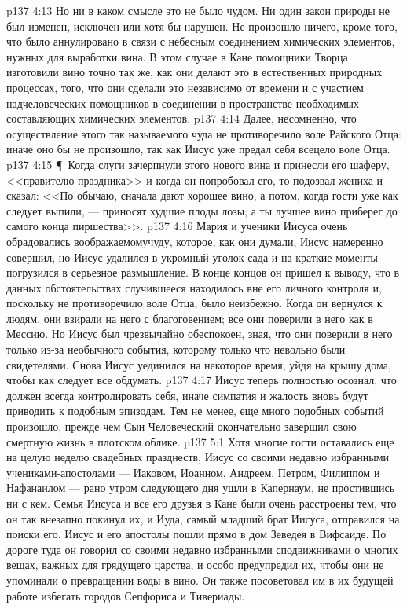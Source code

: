 \vs p137 4:13 Но ни в каком смысле это не было чудом. Ни один закон природы не был изменен, исключен или хотя бы нарушен. Не произошло ничего, кроме того, что было аннулировано  в связи с небесным соединением химических элементов, нужных для выработки вина. В этом случае в Кане помощники Творца изготовили вино точно так же, как они делают это в естественных природных процессах,  того, что они сделали это независимо от времени и с участием надчеловеческих помощников в соединении в пространстве необходимых составляющих химических элементов.
\vs p137 4:14 Далее, несомненно, что осуществление этого так называемого чуда не противоречило воле Райского Отца: иначе оно бы не произошло, так как Иисус уже предал себя всецело воле Отца.
\vs p137 4:15 \P\ Когда слуги зачерпнули этого нового вина и принесли его шаферу, <<правителю праздника>> и когда он попробовал его, то подозвал жениха и сказал: <<По обычаю, сначала дают хорошее вино, а потом, когда гости уже как следует выпили, --- приносят худшие плоды лозы; а ты лучшее вино приберег до самого конца пиршества>>.
\vs p137 4:16 Мария и ученики Иисуса очень обрадовались воображаемомучуду, которое, как они думали, Иисус намеренно совершил, но Иисус удалился в укромный уголок сада и на краткие моменты погрузился в серьезное размышление. В конце концов он пришел к выводу, что в данных обстоятельствах случившееся находилось вне его личного контроля и, поскольку не противоречило воле Отца, было неизбежно. Когда он вернулся к людям, они взирали на него с благоговением; все они поверили в него как в Мессию. Но Иисус был чрезвычайно обеспокоен, зная, что они поверили в него только из\hyp{}за необычного события, которому только что невольно были свидетелями. Снова Иисус уединился на некоторое время, уйдя на крышу дома, чтобы как следует все обдумать.
\vs p137 4:17 Иисус теперь полностью осознал, что должен всегда контролировать себя, иначе симпатия и жалость вновь будут приводить к подобным эпизодам. Тем не менее, еще много подобных событий произошло, прежде чем Сын Человеческий окончательно завершил свою смертную жизнь в плотском облике.
\vs p137 5:1 Хотя многие гости оставались еще на целую неделю свадебных празднеств, Иисус со своими недавно избранными учениками\hyp{}апостолами --- Иаковом, Иоанном, Андреем, Петром, Филиппом и Нафанаилом --- рано утром следующего дня ушли в Капернаум, не простившись ни с кем. Семья Иисуса и все его друзья в Кане были очень расстроены тем, что он так внезапно покинул их, и Иуда, самый младший брат Иисуса, отправился на поиски его. Иисус и его апостолы пошли прямо в дом Зеведея в Вифсаиде. По дороге туда он говорил со своими недавно избранными сподвижниками о многих вещах, важных для грядущего царства, и особо предупредил их, чтобы они не упоминали о превращении воды в вино. Он также посоветовал им в их будущей работе избегать городов Сепфориса и Тивериады.
